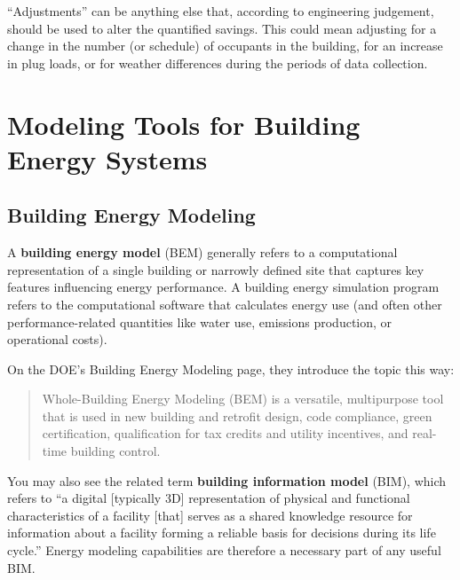\documentclass[10pt]{article}
\begin{document}
``Adjustments'' can be anything else that, according to engineering judgement, should be used to alter the quantified savings. This could mean adjusting for a change in the number (or schedule) of occupants in the building, for an increase in plug loads, or for weather differences during the periods of data collection. 

\section{Modeling Tools for Building Energy Systems}


\subsection{Building Energy Modeling}

A \textbf{building energy model} (BEM) generally refers to a computational representation of a single building or narrowly defined site that captures key features influencing energy performance. A building energy simulation program refers to the computational software that calculates energy use (and often other performance-related quantities like water use, emissions production, or operational costs). 

On the DOE's Building Energy Modeling page, they introduce the topic this way:

\begin{quote}
    Whole-Building Energy Modeling (BEM) is a versatile, multipurpose tool that is used in new building and retrofit design, code compliance, green certification, qualification for tax credits and utility incentives, and real-time building control. \cite{doe-bem}
\end{quote}

You may also see the related term \textbf{building information model} (BIM), which refers to ``a digital [typically 3D] representation of physical and functional characteristics of a facility [that] serves as a shared knowledge resource for information about a facility forming a reliable basis for decisions during its life cycle.'' \cite{noauthor_undated-tr} Energy modeling capabilities are therefore a necessary part of any useful BIM.

\end{document}
